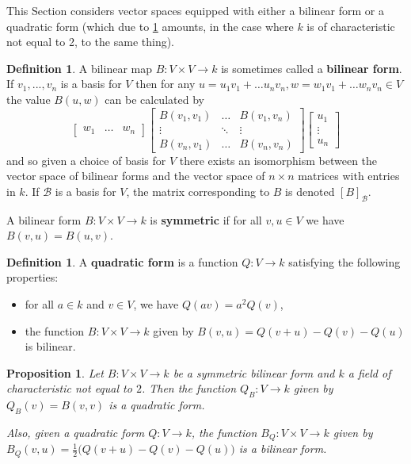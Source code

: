 \documentclass[12pt]{article}
\theoremstyle{plain}
\newtheorem{proposition}[thm]{Proposition}
\theoremstyle{definition}
\newtheorem{defn}[thm]{Definition} %
\newcommand{\scr}[1]{\mathscr{#1}}
\newcommand{\lto}{\longrightarrow}
\begin{document}
This Section considers vector spaces equipped with either a bilinear form or a quadratic form (which due to \ref{prop:bil_quad_form} amounts, in the case where $k$ is of characteristic not equal to 2,  to the same thing).
\begin{defn}
A bilinear map $B:V \times V \lto k$ is sometimes called a \textbf{bilinear form}. If $v_1,...,v_n$ is a basis for $V$ then for any $u = u_1v_1 + \hdots u_n v_n,w = w_1v_1 + \hdots w_n v_n \in V$ the value $B(u,w)$ can be calculated by
\begin{equation}
\begin{bmatrix}
w_1 & \hdots & w_n
\end{bmatrix}
\begin{bmatrix}
B(v_1,v_1) & \hdots & B(v_1, v_n)\\
\vdots & \ddots & \vdots\\
B(v_n,v_1) & \hdots & B(v_n,v_n)
\end{bmatrix}
\begin{bmatrix}
u_1\\
\vdots\\
u_n
\end{bmatrix}
\end{equation}
and so given a choice of basis for $V$ there exists an isomorphism between the vector space of bilinear forms and the vector space of $n \times n$ matrices with entries in $k$. If $\scr{B}$ is a basis for $V$, the matrix corresponding to $B$ is denoted $[B]_{\scr{B}}$.

A bilinear form $B: V \times V \lto k$ is \textbf{symmetric} if for all $v,u \in V$ we have $B(v,u) = B(u,v)$.
\end{defn}
\begin{defn}
A \textbf{quadratic form} is a function $Q: V \lto k$ satisfying the following properties:
\begin{itemize}
    \item for all $a \in k$ and $v \in V$, we have $Q(av) = a^2Q(v)$,
    \item the function $B: V \times V \lto k$ given by $B(v,u) = Q(v + u) - Q(v) - Q(u)$ is bilinear.
\end{itemize}
\end{defn}
\begin{proposition}\label{prop:bil_quad_form}
Let $B: V \times V \lto k$ be a symmetric bilinear form and $k$ a field of characteristic not equal to $2$. Then the function $Q_B: V \lto k$ given by $Q_B(v) = B(v,v)$ is a quadratic form.

Also, given a quadratic form $Q: V \lto k$, the function $B_Q: V \times V \lto k$ given by $B_Q(v,u) = \frac{1}{2}\big(Q(v + u) - Q(v) - Q(u)\big)$ is a bilinear form.
\end{proposition}
\end{document}
